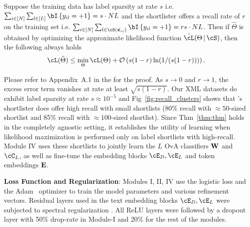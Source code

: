 \begin{theorem}
\label{thm:thm}
Suppose the training data has label sparsity at rate $s$ i.e. $\sum_{i \in [N]}\sum_{l \in [L]} \bI\bc{y_{il} = +1} = s\cdot NL$ and the shortlister offers a recall rate of $r$ on the training set i.e. $\sum_{i \in [N]}\sum_{l \in \cS(\hat\vx_i)}\bI\bc{y_{il} = +1} = rs\cdot NL$. Then if $\hat\Theta$ is obtained by optimizing the approximate likelihood function $\tilde\cL(\Theta \cond \cS)$, then the following always holds
\[
\cL(\hat\Theta) \leq \min_{\Theta} \cL(\Theta) + \bigO{s(1-r)\ln(1/(s(1-r)))}.
\]
\end{theorem}
Please refer to Appendix~A.1 in the \suppl for the proof. As $s \rightarrow 0$ and $r \rightarrow 1$, the excess error term vanishes at rate at least $\sqrt{s(1-r)}$. Our XML datasets do exhibit label sparsity at rate $s \approx 10^{-5}$ and Fig~\ref{fig:recall_clusters} shows that \alg's shortlister does offer high recall with small shortlists (80\% recall with $\approx 50$-sized shortlist and 85\% recall with $\approx 100$-sized shortlist). Since Thm~\ref{thm:thm} holds in the completely agnostic setting, it establishes the utility of learning when likelihood maximization is performed only on label shortlists with high-recall. Module IV uses these shortlists to jointly learn the $L$ OvA classifiers $\protect{\mathbf{W}}$ and $\cC_L$, as well as fine-tune the embedding blocks $\cE_D, \cE_L$ and token embeddings $\protect{\mathbf{E}}$.


\textbf{Loss Function and Regularization}: Modules I, II, IV use the logistic loss and the Adam~\cite{Kingma14} optimizer to train the model parameters and various refinement vectors. Residual layers used in the text embedding blocks $\cE_D, \cE_L$ were subjected to spectral regularization \cite{Miyato18b}. All ReLU layers were followed by a dropout layer with 50\% drop-rate in Module-I and 20\% for the rest of the modules.

